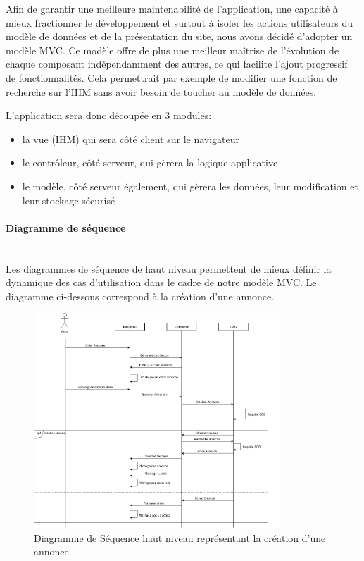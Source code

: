 \documentclass[a4paper,11pt]{article}
\begin{document}
Afin de garantir une meilleure maintenabilité de l'application, une capacité à mieux fractionner le développement
et surtout à isoler les actions utilisateurs du modèle de données et de la présentation du site, nous avons décidé
d'adopter un modèle MVC. Ce modèle offre de plus une meilleur maîtrise de l'évolution de chaque composant
indépendamment des autres, ce qui facilite l'ajout progressif de fonctionnalités. Cela permettrait par exemple de modifier
une fonction de recherche sur l'IHM sans avoir besoin de toucher au modèle de données.

L'application sera donc découpée en 3 modules:
\begin{itemize}
  \item la vue (IHM) qui sera côté client sur le navigateur
  \item le contrôleur, côté serveur, qui gèrera la logique applicative
  \item le modèle, côté serveur également, qui gèrera les données, leur modification et leur stockage sécurisé
\end{itemize}

\paragraph{Diagramme de séquence}\mbox{} \\
Les diagrammes de séquence de haut niveau permettent de mieux définir la dynamique des cas d'utilisation dans le cadre de notre modèle MVC. Le diagramme ci-dessous correspond à la création d'une annonce. \\

\begin{figure}[H]
  \includegraphics[width=350px]{../Conception/DS_annonce.png}
  \caption{Diagramme de Séquence haut niveau représentant la création d'une annonce}
  \label{fig:<un-label-court>}
\end{figure}
\end{document}
